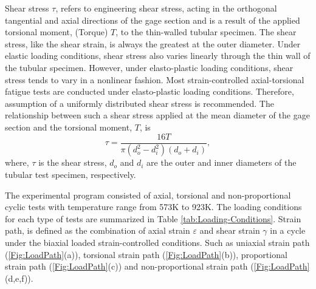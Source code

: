 Shear stress $\tau$, refers to engineering shear stress, acting in the orthogonal tangential and axial directions of the gage section and is a result of the applied torsional moment, (Torque) $T$, to the thin-walled tubular specimen. The shear stress, like the shear strain, is always the greatest at the outer diameter. Under elastic loading conditions, shear stress also varies linearly through the thin wall of the tubular specimen. However, under elasto-plastic loading conditions, shear stress tends to vary in a nonlinear fashion. Most strain-controlled axial-torsional fatigue tests are conducted under elasto-plastic loading conditions. Therefore, assumption of a uniformly distributed shear stress is recommended. The relationship between such a shear stress applied at the mean diameter of the gage section and the torsional moment, $T$, is
\begin{equation}
\tau=\frac{16T}{\pi(d_o^2-d_i^2)(d_o+d_i)},
\end{equation}
where, $\tau$ is the shear stress, $d_o$ and $d_i$ are the outer and inner diameters of the tubular test specimen, respectively.

The experimental program consisted of axial, torsional and non-proportional cyclic tests with temperature range from 573K to 923K.
The loading conditions for each type of tests are summarized in Table \ref{tab:Loading-Conditions}.
Strain path, is defined as the combination of axial strain $\varepsilon$ and shear strain $\gamma$ in a cycle under the biaxial loaded strain-controlled conditions. Such as uniaxial strain path (\ref{Fig:LoadPath}(a)), torsional strain path (\ref{Fig:LoadPath}(b)), proportional strain path (\ref{Fig:LoadPath}(c)) and non-proportional strain path (\ref{Fig:LoadPath}(d,e,f)).

